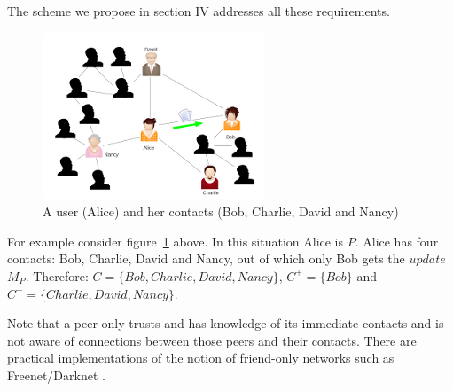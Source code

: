 The scheme we propose in section IV addresses all these requirements.

\begin{figure}[here]
\includegraphics{img/img1.png} 
\caption{A user (Alice) and her contacts (Bob, Charlie, David and Nancy)}
\label{fig:fig1}
\end{figure}

For example consider figure~\ref{fig:fig1} above. In this situation Alice is $P$. Alice has four contacts: Bob, Charlie, David and Nancy, out of which only Bob gets the $update$ $M_P$. Therefore: $C = \{Bob, Charlie, David,Nancy\}$, ${C^+ = \{Bob\}}$ and ${C^- = \{Charlie, David,Nancy\}}$. 

Note that a peer only trusts and has knowledge of its immediate contacts and is not aware of connections between those peers and their contacts. There are practical implementations of the notion of friend-only networks such as Freenet/Darknet \cite{darknet}.

